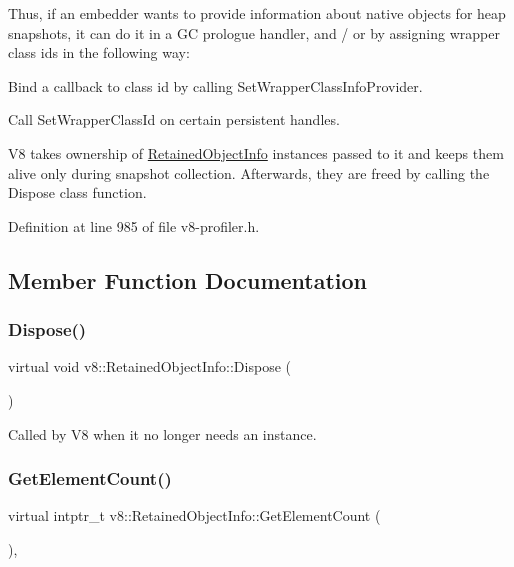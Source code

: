 Thus, if an embedder wants to provide information about native objects for heap snapshots, it can do it in a GC prologue handler, and / or by assigning wrapper class ids in the following way\+:


\begin{DoxyEnumerate}
\item Bind a callback to class id by calling Set\+Wrapper\+Class\+Info\+Provider.
\item Call Set\+Wrapper\+Class\+Id on certain persistent handles.
\end{DoxyEnumerate}

V8 takes ownership of \mbox{\hyperlink{classv8_1_1RetainedObjectInfo}{Retained\+Object\+Info}} instances passed to it and keeps them alive only during snapshot collection. Afterwards, they are freed by calling the Dispose class function. 

Definition at line 985 of file v8-\/profiler.\+h.



\subsection{Member Function Documentation}
\mbox{\label{classv8_1_1RetainedObjectInfo_a5011203f7c5949049ba36b8059f03eca}} 
\subsubsection{\texorpdfstring{Dispose()}{Dispose()}}
{\footnotesize\ttfamily virtual void v8\+::\+Retained\+Object\+Info\+::\+Dispose (\begin{DoxyParamCaption}{ }\end{DoxyParamCaption})\hspace{0.3cm}{\ttfamily [pure virtual]}}

Called by V8 when it no longer needs an instance. \mbox{\label{classv8_1_1RetainedObjectInfo_ae6865597469bc7d28bd8ec71b4b890bd}} 
\subsubsection{\texorpdfstring{Get\+Element\+Count()}{GetElementCount()}}
{\footnotesize\ttfamily virtual intptr\+\_\+t v8\+::\+Retained\+Object\+Info\+::\+Get\+Element\+Count (\begin{DoxyParamCaption}{ }\end{DoxyParamCaption})\hspace{0.3cm}{\ttfamily [inline]}, {\ttfamily [virtual]}}

